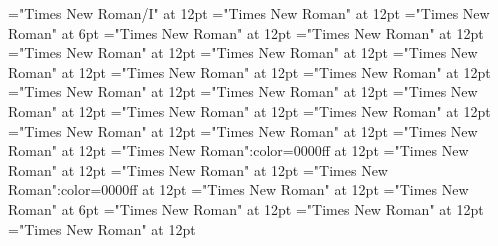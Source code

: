 \documentclass[c5paper,twoside]{article}
\begin{document}
 
\pagestyle{plain} 
\font\AlternateReadingzxxNoteGeneralParagraphParagraphscrSectioncolumnsscrBookscrBody="Times New Roman/I" at 12pt
\font\spanzxxParagraphContinuationscrSectioncolumnsscrBookscrBody="Times New Roman" at 12pt
\font\VerseNumberzxxParagraphContinuationscrSectioncolumnsscrBookscrBody="Times New Roman" at 6pt
\font\ParagraphContinuationscrSectioncolumnsscrBookscrBody="Times New Roman" at 12pt
\font\spanreferenceafterpictureCaptionpictureColumnParagraphscrSectioncolumnsscrBookscrBody="Times New Roman" at 12pt
\font\spanreferencebeforepictureCaptionpictureColumnParagraphscrSectioncolumnsscrBookscrBody="Times New Roman" at 12pt
\font{}="Times New Roman" at 12pt
\font\spanzxxpictureCaptionpictureColumnParagraphscrSectioncolumnsscrBookscrBody="Times New Roman" at 12pt
\font\pictureCaptionpictureColumnParagraphscrSectioncolumnsscrBookscrBody="Times New Roman" at 12pt
\font\picturepictureColumnParagraphscrSectioncolumnsscrBookscrBody="Times New Roman" at 12pt
\font\pictureColumnParagraphscrSectioncolumnsscrBookscrBody="Times New Roman" at 12pt
\font\spanreferenceafterpictureCaptionpicturePageParagraphscrSectioncolumnsscrBookscrBody="Times New Roman" at 12pt
\font\spanreferencebeforepictureCaptionpicturePageParagraphscrSectioncolumnsscrBookscrBody="Times New Roman" at 12pt
\font{}="Times New Roman" at 12pt
\font\spanzxxpictureCaptionpicturePageParagraphscrSectioncolumnsscrBookscrBody="Times New Roman" at 12pt
\font\pictureCaptionpicturePageParagraphscrSectioncolumnsscrBookscrBody="Times New Roman" at 12pt
\font\picturepicturePageParagraphscrSectioncolumnsscrBookscrBody="Times New Roman" at 12pt
\font\picturePageParagraphscrSectioncolumnsscrBookscrBody="Times New Roman" at 12pt
\font\SeeInGlossaryzxxParagraphscrSectioncolumnsscrBookscrBody="Times New Roman":color=0000ff at 12pt
\font\spanzxxLinecscrSectioncolumnsscrBookscrBody="Times New Roman" at 12pt
\font\LinecscrSectioncolumnsscrBookscrBody="Times New Roman" at 12pt
\font\SeeInGlossaryzxxLinebscrSectioncolumnsscrBookscrBody="Times New Roman":color=0000ff at 12pt
\font\spanzxxLinebscrSectioncolumnsscrBookscrBody="Times New Roman" at 12pt
\font\VerseNumberzxxLinebscrSectioncolumnsscrBookscrBody="Times New Roman" at 6pt
\font\LinebscrSectioncolumnsscrBookscrBody="Times New Roman" at 12pt
\font\spanzxxNoteGeneralParagraphParagraphscrSectioncolumnsscrBookscrBody="Times New Roman" at 12pt
\font\QuotedTextzxxNoteGeneralParagraphParagraphscrSectioncolumnsscrBookscrBody="Times New Roman" at 12pt
\end{document}
